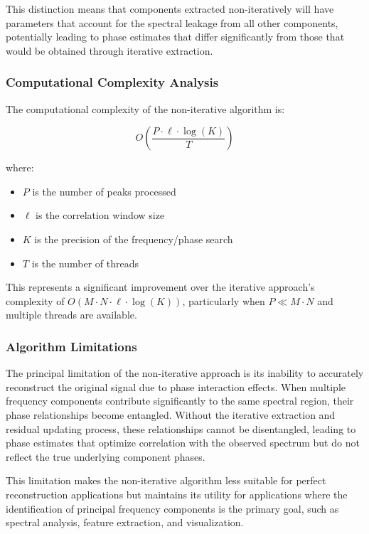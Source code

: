 \documentclass[11pt,twoside]{report}
\numberwithin{thm}{section}
\numberwithin{equation}{section}
\begin{document}
This distinction means that components extracted non-iteratively will have parameters that account for the spectral leakage from all other components, potentially leading to phase estimates that differ significantly from those that would be obtained through iterative extraction.

\subsubsection{Computational Complexity Analysis}

The computational complexity of the non-iterative algorithm is:

\begin{equation}
O\left(\frac{P \cdot \ell \cdot \log(K)}{T}\right)
\end{equation}

where:
\begin{itemize}
    \item $P$ is the number of peaks processed
    \item $\ell$ is the correlation window size
    \item $K$ is the precision of the frequency/phase search
    \item $T$ is the number of threads
\end{itemize}

This represents a significant improvement over the iterative approach's complexity of $O(M \cdot N \cdot \ell \cdot \log(K))$, particularly when $P \ll M \cdot N$ and multiple threads are available.

\subsubsection{Algorithm Limitations}

The principal limitation of the non-iterative approach is its inability to accurately reconstruct the original signal due to phase interaction effects. When multiple frequency components contribute significantly to the same spectral region, their phase relationships become entangled. Without the iterative extraction and residual updating process, these relationships cannot be disentangled, leading to phase estimates that optimize correlation with the observed spectrum but do not reflect the true underlying component phases.

This limitation makes the non-iterative algorithm less suitable for perfect reconstruction applications but maintains its utility for applications where the identification of principal frequency components is the primary goal, such as spectral analysis, feature extraction, and visualization.
\end{document}
